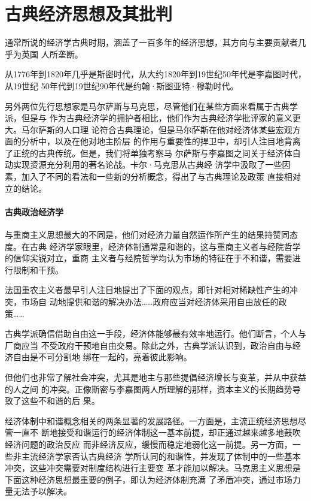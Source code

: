 \part{古典经济思想及其批判}

通常所说的经济学古典时期，涵盖了一百多年的经济思想，其方向与主要贡献者几乎为英国
人所垄断。

从1776年到1820年几乎是斯密时代，从大约1820年到19世纪50年代是李嘉图时代，从19世纪
50年代到19世纪90年代是约翰·斯图亚特·穆勒时代。

另外两位先行思想家是马尔萨斯与马克思，尽管他们在某些方面来看属于古典学派，但是与
作为古典经济学的拥护者相比，他们作为古典经济学批评家的意义更大。马尔萨斯的人口理
论符合古典理论，但是马尔萨斯在他对经济体某些宏观方面的分析中，以及在他对地主阶层
的作用与重要性的捍卫中，却引人注目地背离了正统的古典传统。但是，我们将单独考察马
尔萨斯与李嘉图之间关于经济体自动实现资源充分利用的著名论战。卡尔·马克思从古典经
济学中汲取了一些因素，加入了不同的看法和一些新的分析概念，得出了与古典理论及政策
直接相对立的结论。

\subsection*{古典政治经济学}

与重商主义思想最大的不同是，他们对经济力量自然运作所产生的结果持赞同态度。在古典
经济学家眼里，经济体制通常是和谐的，这与重商主义者与经院哲学的信仰尖锐对立，重商
主义者与经院哲学均认为市场的特征在于不和谐，需要进行限制和干预。

法国重农主义者最早引人注目地提出了下面的观点，即针对相对稀缺性产生的冲突，市场自
动地提供和谐的解决办法……政府应当对经济体采用自由放任的政策……

古典学派确信借助自由这一手段，经济体能够最有效率地运行。他们断言，个人与厂商应当
不受政府干预地自由交易。除此之外，古典学派认识到，政治自由与经济自由是不可分割地
绑在一起的，亮着彼此影响。

但他们也非常了解社会冲突，尤其是地主与那些提倡经济增长与变革，并从中获益的人之间
的冲突。正像斯密与李嘉图两人所理解的那样，资本主义的长期趋势导致了这些不和谐的后
果。

经济体制中和谐概念相关的两条显著的发展路径。一方面是，主流正统经济思想尽管一直不
断地接受和谐运行的经济体制这一基本前提，却正通过越来越多地鼓吹经济问题的政治反应
而非经济反应，缓慢而稳定地弱化这一前提。另一方面，一些非主流经济学家否认古典经济
学所认同的和谐性，并发现了体制中的一些基本冲突，这些冲突需要对制度结构进行主要变
革才能加以解决。马克思主义思想是下面这种经济思想最重要的例子，即认为经济体制充满
了矛盾冲突，通过市场力量无法予以解决。

